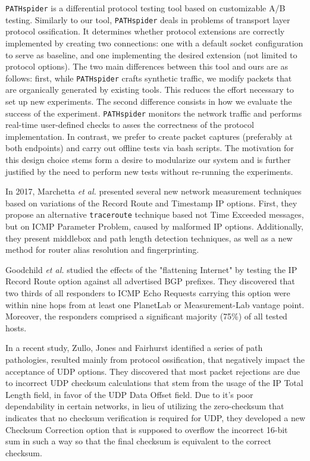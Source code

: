\texttt{PATHspider} \cite{learmonth2016pathspider} is a differential protocol testing tool based on customizable A/B testing. Similarly to our tool, \texttt{PATHspider} deals in problems of transport layer protocol ossification. It determines whether protocol extensions are correctly implemented by creating two connections: one with a default socket configuration to serve as baseline, and one implementing the desired extension (not limited to protocol options). The two main differences between this tool and ours are as follows: first, while \texttt{PATHspider} crafts synthetic traffic, we modify packets that are organically generated by existing tools. This reduces the effort necessary to set up new experiments. The second difference consists in how we evaluate the success of the experiment. \texttt{PATHspider} monitors the network traffic and performs real-time user-defined checks to asses the correctness of the protocol implementation. In contrast, we prefer to create packet captures (preferably at both endpoints) and carry out offline tests via bash scripts. The motivation for this design choice stems form a desire to modularize our system and is further justified by the need to perform new tests without re-running the experiments.

In 2017, Marchetta \textit{et al.} \cite{marchetta2017measuring} presented several new network measurement techniques based on variations of the Record Route and Timestamp IP options. First, they propose an alternative \texttt{traceroute} technique based not Time Exceeded messages, but on ICMP Parameter Problem, caused by malformed IP options. Additionally, they present middlebox and path length detection techniques, as well as a new method for router alias resolution and fingerprinting.

Goodchild \textit{et al.} \cite{goodchild2017record} studied the effects of the "flattening Internet" \cite{gill2008flattening} by testing the IP Record Route option against all advertised BGP prefixes. They discovered that two thirds of all responders to ICMP Echo Requests carrying this option were within nine hops from at least one PlanetLab or Measurement-Lab vantage point. Moreover, the responders comprised a significant majority (75\%) of all tested hosts.

In a recent study, Zullo, Jones and Fairhurst \cite{zullo2020overcoming} identified a series of path pathologies, resulted mainly from protocol ossification, that negatively impact the acceptance of UDP options. They discovered that most packet rejections are due to incorrect UDP checksum calculations that stem from the usage of the IP Total Length field, in favor of the UDP Data Offset field. Due to it's poor dependability in certain networks, in lieu of utilizing the zero-checksum that indicates that no checksum verification is required for UDP, they developed a new Checksum Correction option that is supposed to overflow the incorrect 16-bit sum in such a way so that the final checksum is equivalent to the correct checksum.


